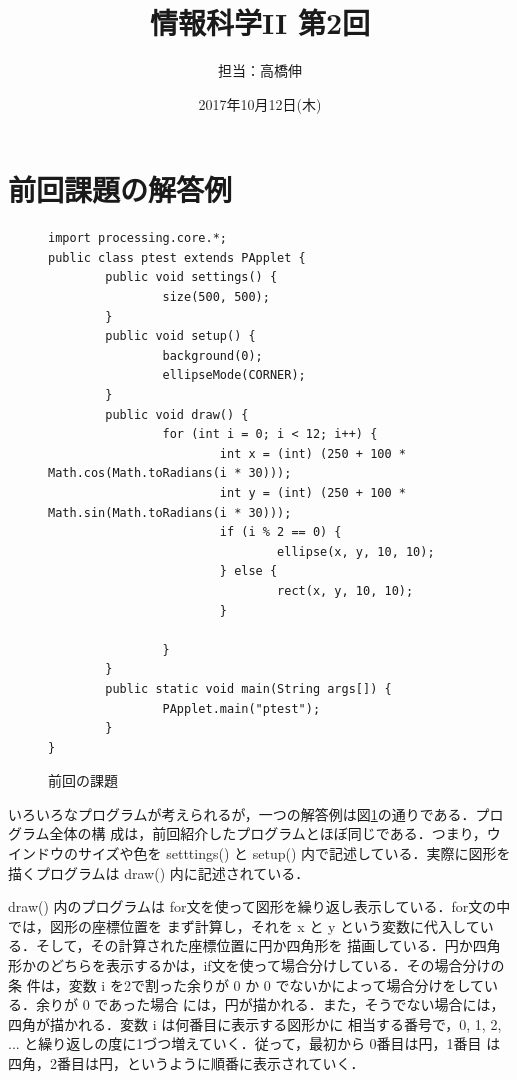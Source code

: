 \documentclass[a4paper,xelatex,ja=standard]{bxjsarticle}
\title{情報科学II 第2回}
\date{2017年10月12日(木)}
\author{担当：高橋伸}
\begin{document}
\maketitle

\section{前回課題の解答例}

\begin{figure}[hbtp]
\begin{verbatim}
import processing.core.*;
public class ptest extends PApplet {
        public void settings() {
                size(500, 500);
        }
        public void setup() {
                background(0);
                ellipseMode(CORNER);
        }
        public void draw() {
                for (int i = 0; i < 12; i++) {
                        int x = (int) (250 + 100 * Math.cos(Math.toRadians(i * 30)));
                        int y = (int) (250 + 100 * Math.sin(Math.toRadians(i * 30)));
                        if (i % 2 == 0) {
                                ellipse(x, y, 10, 10);
                        } else {
                                rect(x, y, 10, 10);
                        }

                }
        }
        public static void main(String args[]) {
                PApplet.main("ptest");
        }
}
\end{verbatim}
\caption{前回の課題}
\label{kadai1}
\end{figure}

いろいろなプログラムが考えられるが，一つの解答例は図\ref{kadai1}の通りである．プログラム全体の構
成は，前回紹介したプログラムとほぼ同じである．つまり，ウインドウのサイズや色を setttings() と
setup() 内で記述している．実際に図形を描くプログラムは draw() 内に記述されている．

draw() 内のプログラムは for文を使って図形を繰り返し表示している．for文の中では，図形の座標位置を
まず計算し，それを x と y という変数に代入している．そして，その計算された座標位置に円か四角形を
描画している．円か四角形かのどちらを表示するかは，if文を使って場合分けしている．その場合分けの条
件は，変数 i を2で割った余りが 0 か 0 でないかによって場合分けをしている．余りが 0 であった場合
には，円が描かれる．また，そうでない場合には，四角が描かれる．変数 i は何番目に表示する図形かに
相当する番号で，0, 1, 2, ... と繰り返しの度に1づつ増えていく．従って，最初から 0番目は円，1番目
は四角，2番目は円，というように順番に表示されていく．
\end{document}
